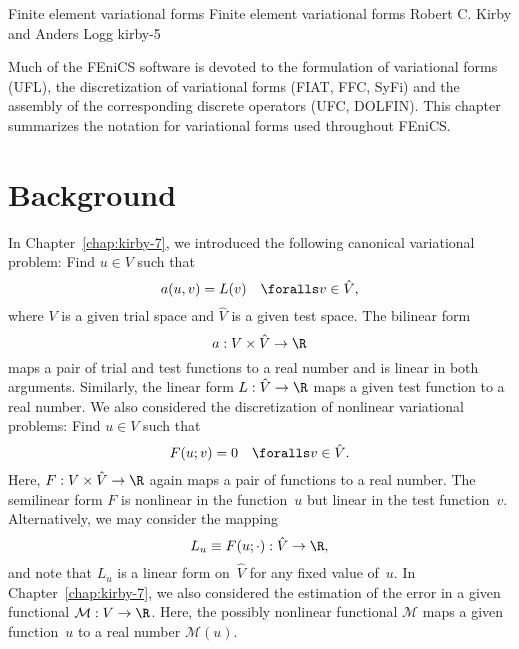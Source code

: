               {Finite element variational forms}
              {Finite element variational forms}
              {Robert C. Kirby and Anders Logg}
              {kirby-5}

Much of the FEniCS software is devoted to the formulation of
variational forms (UFL), the discretization of variational forms
(FIAT, FFC, SyFi) and the assembly of the corresponding discrete
operators (UFC, DOLFIN). This chapter summarizes the notation for
variational forms used throughout FEniCS.

\section{Background}

In Chapter~\ref{chap:kirby-7}, we introduced the following canonical
variational problem: Find $u \in V$ such that
\begin{equation} \label{eq:kirby-5:canonical}
  a(u, v) = L(v) \quad \foralls v \in \hat{V},
\end{equation}
where $V$ is a given trial space and $\hat{V}$ is a given test space.
The bilinear form
\begin{equation}
  a: V \times \hat{V} \rightarrow \R
\end{equation}
maps a pair of trial and test functions to a real number and is linear
in both arguments. Similarly, the linear form $L: \hat{V} \rightarrow
\R$ maps a given test function to a real number. We also considered
the discretization of nonlinear variational problems: Find $u \in V$
such that
\begin{equation}
  F(u; v) = 0 \quad \foralls v \in \hat{V}.
\end{equation}
Here, $F: V \times \hat{V} \rightarrow \R$ again maps a pair of
functions to a real number. The semilinear form $F$ is nonlinear in
the function~$u$ but linear in the test function~$v$. Alternatively,
we may consider the mapping
\begin{equation}
  L_u \equiv F(u; \cdot) : \hat{V} \rightarrow \R,
\end{equation}
and note that $L_u$ is a linear form on~$\hat{V}$ for any fixed value
of~$u$. In Chapter~\ref{chap:kirby-7}, we also considered the
estimation of the error in a given functional $\mathcal{M} : V
\rightarrow \R$. Here, the possibly nonlinear functional $\mathcal{M}$
maps a given function~$u$ to a real number $\mathcal{M}(u)$.

